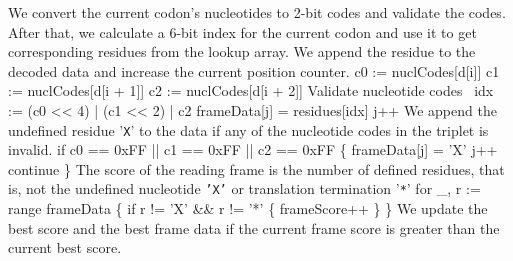 We convert the current codon's nucleotides to 2-bit codes and validate
the codes. After that, we calculate a 6-bit index for the current
codon and use it to get corresponding residues from the lookup
array. We append the residue to the decoded data and increase the
current position counter.
\nwenddocs{}\endmoddef\nwstartdeflinemarkup{}\nwenddeflinemarkup
c0 := nuclCodes[d[i]]
c1 := nuclCodes[d[i + 1]]
c2 := nuclCodes[d[i + 2]]
\LA{}Validate nucleotide codes~{\nwtagstyle{}}\RA{}
idx := (c0 << 4) | (c1 << 2) | c2
frameData[j] = residues[idx]
j++
\nwendcode{}\nwdocspar
We append the undefined residue '\texttt{X}' to the data if any of the
nucleotide codes in the triplet is invalid.
\nwenddocs{}\endmoddef\nwstartdeflinemarkup{}\nwenddeflinemarkup
if c0 == 0xFF || c1 == 0xFF || c2 == 0xFF \{
          frameData[j] = 'X'
          j++
          continue
\}
\nwendcode{}\nwdocspar
The score of the reading frame is the number of defined residues, that
is, not the undefined nucleotide \texttt{'X'} or translation
termination '\texttt{*}'
\nwenddocs{}\endmoddef\nwstartdeflinemarkup{}\nwenddeflinemarkup
for _, r := range frameData \{
          if r != 'X' && r != '*' \{
                  frameScore++
          \}
\}
\nwendcode{}\nwdocspar
We update the best score and the best frame data if the current frame
score is greater than the current best score.
\nwenddocs{}\endmoddef\nwstartdeflinemarkup{}\nwenddeflinemarkup
